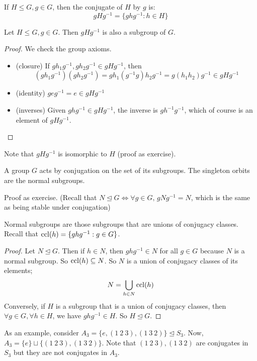 \begin{definition}
	If \(H \leq G, g \in G\), then the conjugate of \(H\) by \(g\) is:
	\[
		gHg^{-1} = \{ ghg^{-1} : h \in H \}
	\]
\end{definition}
\begin{proposition}
	Let \(H \leq G, g \in G\).
	Then \(gHg^{-1}\) is also a subgroup of \(G\).
\end{proposition}
\begin{proof}
	We check the group axioms.
	\begin{itemize}
		\item (closure) If \(gh_1g^{-1}, gh_2g^{-1} \in gHg^{-1}\), then
		      \[
			      (gh_1g^{-1})(gh_2g^{-1}) = gh_1(g^{-1}g)h_2g^{-1} = g(h_1h_2)g^{-1} \in gHg^{-1}
		      \]
		\item (identity) \(geg^{-1} = e \in gHg^{-1}\)
		\item (inverses) Given \(ghg^{-1} \in gHg^{-1}\), the inverse is \(gh^{-1}g^{-1}\), which of course is an element of \(gHg^{-1}\).
	\end{itemize}
\end{proof}
Note that \(gHg^{-1}\) is isomorphic to \(H\) (proof as exercise).
\begin{proposition}
	A group \(G\) acts by conjugation on the set of its subgroups.
	The singleton orbits are the normal subgroups.
\end{proposition}
Proof as exercise.
(Recall that \(N \trianglelefteq G \iff \forall g \in G,\, gNg^{-1} = N\), which is the same as being stable under conjugation)
\begin{proposition}
	Normal subgroups are those subgroups that are unions of conjugacy classes.
	Recall that \(\operatorname{ccl}(h) = \{ ghg^{-1} : g \in G \}\).
\end{proposition}
\begin{proof}
	Let \(N \trianglelefteq G\).
	Then if \(h \in N\), then \(ghg^{-1} \in N\) for all \(g \in G\) because \(N\) is a normal subgroup.
	So \(\operatorname{ccl}(h) \subseteq N\).
	So \(N\) is a union of conjugacy classes of its elements;
	\[
		N = \bigcup_{h \in N} \operatorname{ccl}(h)
	\]
	Conversely, if \(H\) is a subgroup that is a union of conjugacy classes, then \(\forall g \in G, \forall h \in H\), we have \(ghg^{-1} \in H\).
	So \(H \trianglelefteq G\).
\end{proof}
As an example, consider \(A_3 = \{ e, (1\ 2\ 3), (1\ 3\ 2) \} \trianglelefteq S_3\).
Now, \(A_3 = \{ e \} \sqcup \{ (1\ 2\ 3), (1\ 3\ 2) \}\).
Note that \((1\ 2\ 3), (1\ 3\ 2)\) are conjugates in \(S_3\) but they are not conjugates in \(A_3\).

